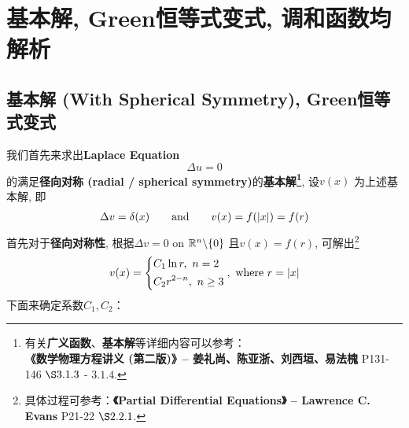 \newpage

\section{基本解, Green恒等式变式, 调和函数均解析}

\subsection{基本解 (With Spherical Symmetry), Green恒等式变式}
	我们首先来求出\textbf{Laplace Equation}
	\[ \Delta u = 0 \]
	的满足\textbf{径向对称 (radial / spherical symmetry)}的\textbf{基本解\footnote{有关\textbf{广义函数}、\textbf{基本解}等详细内容可以参考：\\
	\hspace*{4em} \textbf{《数学物理方程讲义 (第二版)》--  姜礼尚、陈亚浙、刘西垣、易法槐} P131-146 $\S 3.1.3$ - $3.1.4$.}}, 设$v(x)$ 为上述基本解, 即
	\begin{align*}
		\Delta v = \delta(x) \hspace*{2em} \text{and} \hspace*{2em} v(x) = f(|x|) = f(r)
	\end{align*}
	首先对于\textbf{径向对称性}, 根据$\Delta v = 0$ on $\mathbb{R}^n \backslash \{ 0 \}$ 且$v(x) = f(r)$, 可解出\footnote{具体过程可参考：\textbf{《Partial Differential Equations》 -- Lawrence C. Evans} P21-22 $\S 2.2.1$. }
	\begin{align*}
		v(x) = 
		\begin{dcases*}
			C_1 \ln r , \,\, n = 2 \\
			C_2 r^{2 - n} , \,\, n \geq 3
		\end{dcases*} , \,\, \text{where} \,\, r = |x|
	\end{align*}
	下面来确定系数$C_1 , C_2$：
	
	\vspace*{6em}
	
